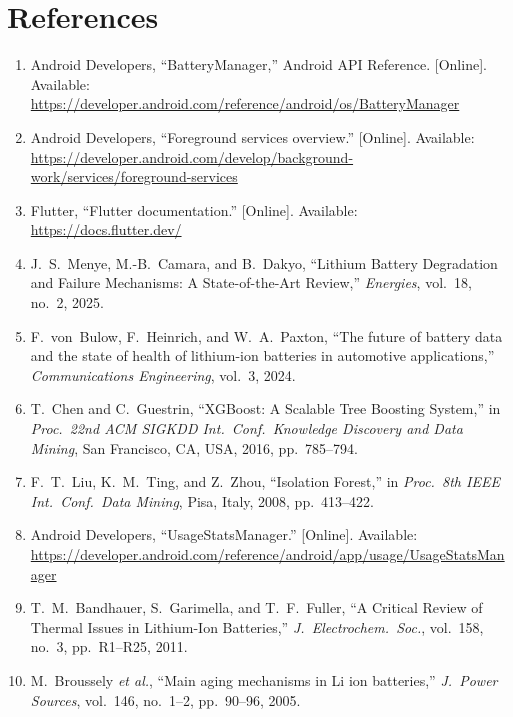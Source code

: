 \documentclass[12pt,a4paper]{report}
\begin{document}
\chapter*{References}
\renewcommand{\labelenumi}{[\theenumi]}
\begin{enumerate}

\item Android Developers, ``BatteryManager,'' Android API Reference. [Online].
  Available: \url{https://developer.android.com/reference/android/os/BatteryManager}

\item Android Developers, ``Foreground services overview.'' [Online].
  Available: \url{https://developer.android.com/develop/background-work/services/foreground-services}

\item Flutter, ``Flutter documentation.'' [Online].
  Available: \url{https://docs.flutter.dev/}

\item J.~S.~Menye, M.-B.~Camara, and B.~Dakyo, ``Lithium Battery Degradation and
  Failure Mechanisms: A State-of-the-Art Review,'' \textit{Energies}, vol.~18,
  no.~2, 2025.

\item F.~von~Bulow, F.~Heinrich, and W.~A.~Paxton, ``The future of battery data
  and the state of health of lithium-ion batteries in automotive applications,''
  \textit{Communications Engineering}, vol.~3, 2024.

\item T.~Chen and C.~Guestrin, ``XGBoost: A Scalable Tree Boosting System,''
  in \textit{Proc.\ 22nd ACM SIGKDD Int.\ Conf.\ Knowledge Discovery and Data
  Mining}, San Francisco, CA, USA, 2016, pp.~785--794.

\item F.~T.~Liu, K.~M.~Ting, and Z.~Zhou, ``Isolation Forest,'' in
  \textit{Proc.\ 8th IEEE Int.\ Conf.\ Data Mining}, Pisa, Italy, 2008,
  pp.~413--422.

\item Android Developers, ``UsageStatsManager.'' [Online].
  Available: \url{https://developer.android.com/reference/android/app/usage/UsageStatsManager}

\item T.~M.~Bandhauer, S.~Garimella, and T.~F.~Fuller, ``A Critical Review of
  Thermal Issues in Lithium-Ion Batteries,'' \textit{J.\ Electrochem.\ Soc.},
  vol.~158, no.~3, pp.~R1--R25, 2011.

\item M.~Broussely \textit{et al.}, ``Main aging mechanisms in Li ion batteries,''
  \textit{J.\ Power Sources}, vol.~146, no.~1--2, pp.~90--96, 2005.

\end{enumerate}



\end{document}
